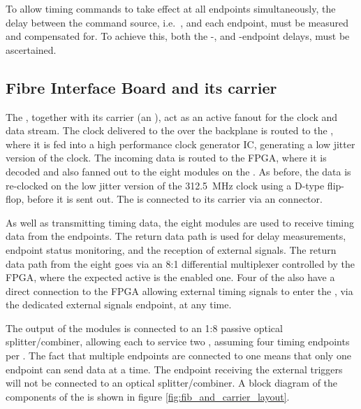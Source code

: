 \documentclass{dune}
\begin{document}
To allow timing commands to take effect at all endpoints simultaneously, the delay between the command source, i.e.\ , and each endpoint, must be measured and compensated for. To achieve this, both the -, and -endpoint delays, must be ascertained.

\subsection{Fibre Interface Board and its carrier}
The , together with its carrier (an ), act as an active fanout for the  clock and data stream. The clock delivered to the  over the  backplane is routed to the , where it is fed into a high performance clock generator IC, generating a low jitter version of the clock. The incoming data is routed to the  FPGA, where it is decoded and also fanned out to the eight  modules on the . As before, the  data is re-clocked on the low jitter version of the \SI{312.5}{\MHz} clock using a D-type flip-flop, before it is sent out. The  is connected to its  carrier via an  connector.

As well as transmitting timing data, the eight  modules are used to receive timing data from the endpoints. The return data path is used for delay measurements, endpoint status monitoring, and the reception of external signals. The return data path from the eight  goes via an 8:1 differential multiplexer controlled by the  FPGA, where the expected active  is the enabled one. Four of the  also have a direct connection to the  FPGA allowing external timing signals to enter the , via the dedicated external signals endpoint, at any time.

The output of the  modules is connected to an 1:8 passive optical splitter/combiner, allowing each  to service two , assuming four timing endpoints per . The fact that multiple endpoints are connected to one  means that only one endpoint can send  data at a time. The endpoint receiving the external triggers will not be connected to an optical splitter/combiner. A block diagram of the components of the  is shown in figure \ref{fig:fib_and_carrier_layout}.
\end{document}
